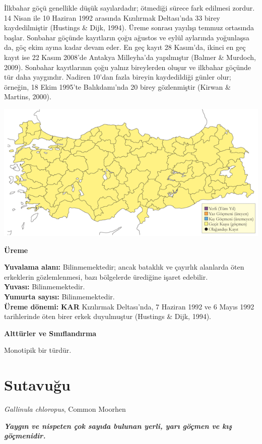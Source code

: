 \documentclass[
  a4paper,
  DIV=11,
  numbers=noendperiod]{scrreprt}
\begin{document}
İlkbahar göçü genellikle düşük sayılardadır; ötmediği sürece fark
edilmesi zordur. 14 Nisan ile 10 Haziran 1992 arasında Kızılırmak
Deltası'nda 33 birey kaydedilmiştir (Hustings \& Dijk, 1994). Üreme
sonrası yayılışı temmuz ortasında başlar. Sonbahar göçünde kayıtların
çoğu ağustos ve eylül aylarında yoğunlaşsa da, göç ekim ayına kadar
devam eder. En geç kayıt 28 Kasım'da, ikinci en geç kayıt ise 22 Kasım
2008'de Antakya Milleyha'da yapılmıştır (Balmer \& Murdoch, 2009).
Sonbahar kayıtlarının çoğu yalnız bireylerden oluşur ve ilkbahar göçünde
tür daha yaygındır. Nadiren 10'dan fazla bireyin kaydedildiği günler
olur; örneğin, 18 Ekim 1995'te Balıkdamı'nda 20 birey gözlenmiştir
(Kirwan \& Martins, 2000).

\includegraphics{images/harita_Page_119.png}

\textbf{Üreme}

\textbf{Yuvalama alanı:} Bilinmemektedir; ancak bataklık ve çayırlık
alanlarda öten erkeklerin gözlemlenmesi, bazı bölgelerde ürediğine
işaret edebilir.\\
\textbf{Yuvası:} Bilinmemektedir.\\
\textbf{Yumurta sayısı:} Bilinmemektedir.\\
\textbf{Üreme dönemi:} \textbf{KAR} Kızılırmak Deltası'nda, 7 Haziran
1992 ve 6 Mayıs 1992 tarihlerinde öten birer erkek duyulmuştur (Hustings
\& Dijk, 1994).

\textbf{Alttürler ve Sınıflandırma}

Monotipik bir türdür.

\section{Sutavuğu}\label{sutavuux11fu}

\emph{Gallinula chloropus}, Common Moorhen

\textbf{\emph{Yaygın ve nispeten çok sayıda bulunan yerli, yarı göçmen
ve kış göçmenidir.}}
\end{document}
